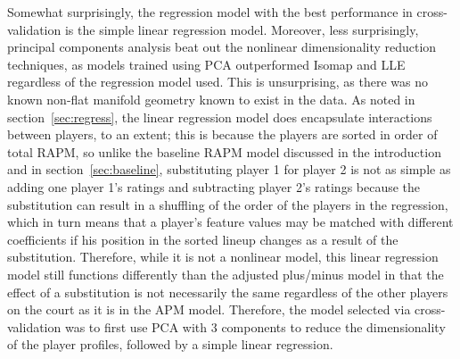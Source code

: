 \begin{table}
    \centering
    \noindent{}
    \caption{A summary of the results of hyperparameter tuning and cross-validation;
    each entry in the table is the cross-validation root mean squared error for a
    given combination of dimensionality reduction and regression techniques.}
    \label{tab:cv_results}
\end{table}

Somewhat surprisingly, the regression model with the best performance in
cross-validation is the simple linear regression model. Moreover, less surprisingly,
principal components analysis beat out the nonlinear dimensionality reduction
techniques, as models trained using PCA outperformed Isomap and LLE regardless of
the regression model used. This is unsurprising, as there was no known non-flat
manifold geometry known to exist in the data. As noted in section~\ref{sec:regress},
the linear regression model does encapsulate interactions between players, to an
extent; this is because the players are sorted in order of total RAPM, so unlike the
baseline RAPM model discussed in the introduction and in section~\ref{sec:baseline},
substituting player 1 for player 2 is not as simple as adding one player 1's ratings
and subtracting player 2's ratings because the substitution can result in a
shuffling of the order of the players in the regression, which in turn means that a
player's feature values may be matched with different coefficients if his position
in the sorted lineup changes as a result of the substitution. Therefore, while it is
not a nonlinear model, this linear regression model still functions differently than
the adjusted plus/minus model in that the effect of a substitution is not
necessarily the same regardless of the other players on the court as it is in the
APM model. Therefore, the model selected via cross-validation was to first use PCA
with 3 components to reduce the dimensionality of the player profiles, followed by a
simple linear regression.

